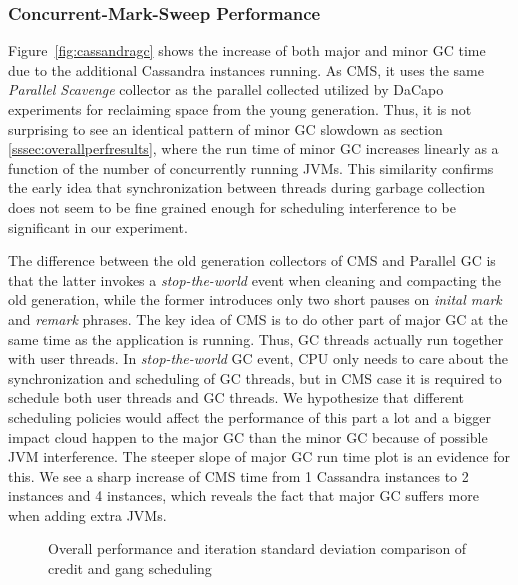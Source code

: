 \documentclass{sig-alternate}
\begin{document}
\subsubsection{Concurrent-Mark-Sweep Performance}
Figure~\ref{fig:cassandragc} shows the increase of both major and minor GC time due to the additional Cassandra instances running. As CMS, it uses the same \textit{Parallel Scavenge} collector as the parallel collected utilized by DaCapo experiments for reclaiming space from the young generation. Thus, it is not surprising to see an identical pattern of minor GC slowdown as section \ref{sssec:overallperfresults}, where the run time of minor GC increases linearly as a function of the number of concurrently running JVMs. This similarity confirms the early idea that synchronization between threads during garbage collection does not seem to be fine grained enough for scheduling interference to be significant in our experiment.

The difference between the old generation collectors of CMS and Parallel GC is that the latter invokes a \textit{stop-the-world} event when cleaning and compacting the old generation, while the former introduces only two short pauses on \textit{inital mark} and \textit{remark} phrases. The key idea of CMS is to do other part of major GC at the same time as the application is running. Thus, GC threads actually run together with user threads. In \textit{stop-the-world} GC event, CPU only needs to care about the synchronization and scheduling of GC threads, but in CMS case it is required to schedule both user threads and GC threads. We hypothesize that different scheduling policies would affect the performance of this part a lot and a bigger impact cloud happen to the major GC than the minor GC because of possible JVM interference. The steeper slope of major GC run time plot is an evidence for this. We see a sharp increase of CMS time from 1 Cassandra instances to 2 instances and 4 instances, which reveals the fact that major GC suffers more when adding extra JVMs.


\begin{figure*}
\centering
{}
\caption{Overall performance and iteration standard deviation comparison of credit and gang scheduling}
\label{fig:gsresults}
\end{figure*}
\end{document}
